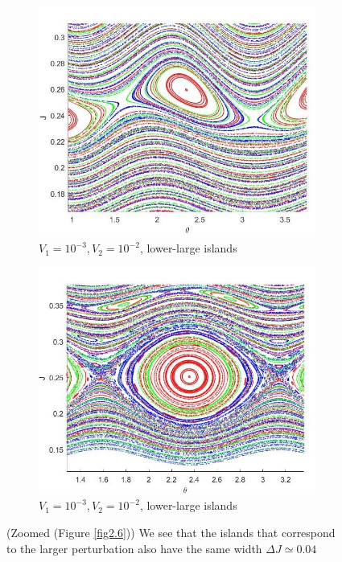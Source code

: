 \begin{figure}[H]
	\begin{subfigure}{.49\textwidth}
  		\includegraphics[scale=0.47,left]{Hamiltonian_1/numerical/figs/Q5_1e-2.1e-3_3634_zoom2}
  		\caption{$V_1=10^{-3},V_2=10^{-2}$, lower-large islands}
  		\label{fig2.7c}
	\end{subfigure}
	\begin{subfigure}{.49\textwidth}
  		\includegraphics[scale=0.47,right]{Hamiltonian_1/numerical/figs/Q5_1e-3.1e-2_3634_zoom2}
  		\caption{$V_1=10^{-3},V_2=10^{-2}$, lower-large islands}
  		\label{fig2.7d}
	\end{subfigure}
	\caption{(Zoomed (Figure \ref{fig2.6})) We see that the islands that correspond to the larger perturbation also have the same width $\Delta J\simeq 0.04$}
	\label{fig2.7}
\end{figure}
